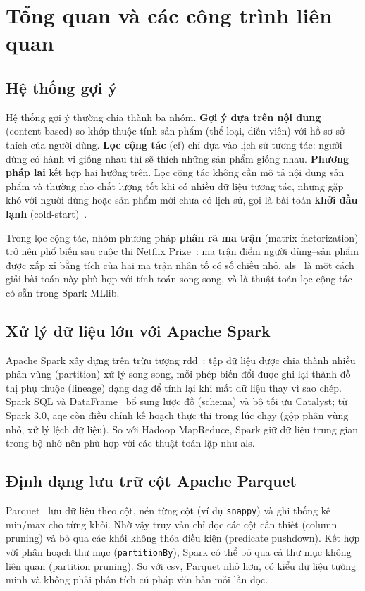 \chapter{Tổng quan và các công trình liên quan}
\label{chap:tong_quan}

\section{Hệ thống gợi ý}
\label{sec:he_goi_y}
Hệ thống gợi ý thường chia thành ba nhóm. \textbf{Gợi ý dựa trên nội dung} (content-based) so khớp thuộc tính sản phẩm (thể loại, diễn viên) với hồ sơ sở thích của người dùng. \textbf{Lọc cộng tác} (\gls{cf}) chỉ dựa vào lịch sử tương tác: người dùng có hành vi giống nhau thì sẽ thích những sản phẩm giống nhau. \textbf{Phương pháp lai} kết hợp hai hướng trên. Lọc cộng tác không cần mô tả nội dung sản phẩm và thường cho chất lượng tốt khi có nhiều dữ liệu tương tác, nhưng gặp khó với người dùng hoặc sản phẩm mới chưa có lịch sử, gọi là bài toán \textbf{khởi đầu lạnh} (cold-start)~\cite{schein2002coldstart}.

Trong lọc cộng tác, nhóm phương pháp \textbf{phân rã ma trận} (matrix factorization) trở nên phổ biến sau cuộc thi Netflix Prize~\cite{koren2009matrix}: ma trận điểm người dùng--sản phẩm được xấp xỉ bằng tích của hai ma trận nhân tố có số chiều nhỏ. \gls{als}~\cite{zhou2008als} là một cách giải bài toán này phù hợp với tính toán song song, và là thuật toán lọc cộng tác có sẵn trong Spark MLlib.

\section{Xử lý dữ liệu lớn với Apache Spark}
\label{sec:spark}
Apache Spark xây dựng trên trừu tượng \gls{rdd}~\cite{zaharia2012rdd}: tập dữ liệu được chia thành nhiều phân vùng (partition) xử lý song song, mỗi phép biến đổi được ghi lại thành đồ thị phụ thuộc (lineage) dạng \gls{dag} để tính lại khi mất dữ liệu thay vì sao chép. Spark SQL và DataFrame~\cite{armbrust2015sparksql} bổ sung lược đồ (schema) và bộ tối ưu Catalyst; từ Spark 3.0, \gls{aqe} còn điều chỉnh kế hoạch thực thi trong lúc chạy (gộp phân vùng nhỏ, xử lý lệch dữ liệu). So với Hadoop MapReduce, Spark giữ dữ liệu trung gian trong bộ nhớ nên phù hợp với các thuật toán lặp như \gls{als}.

\section{Định dạng lưu trữ cột Apache Parquet}
\label{sec:parquet}
Parquet~\cite{parquet} lưu dữ liệu theo cột, nén từng cột (ví dụ \texttt{snappy}) và ghi thống kê min/max cho từng khối. Nhờ vậy truy vấn chỉ đọc các cột cần thiết (column pruning) và bỏ qua các khối không thỏa điều kiện (predicate pushdown). Kết hợp với phân hoạch thư mục (\texttt{partitionBy}), Spark có thể bỏ qua cả thư mục không liên quan (partition pruning). So với \gls{csv}, Parquet nhỏ hơn, có kiểu dữ liệu tường minh và không phải phân tích cú pháp văn bản mỗi lần đọc.

